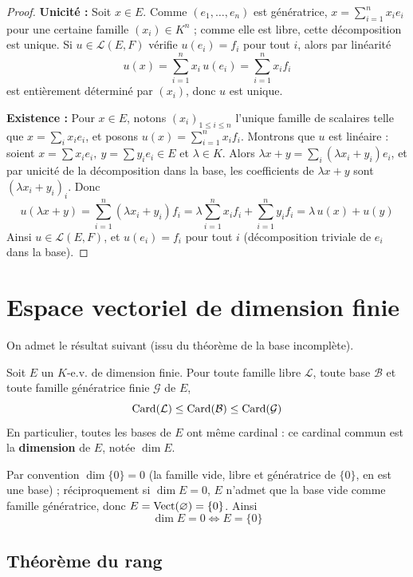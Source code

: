 \begin{proof}
\textbf{Unicité :} Soit $x\in E$. Comme $(e_1,\dots,e_n)$ est génératrice, $x=\sum_{i=1}^n x_i e_i$ pour une certaine famille $(x_i)\in K^n$ ; comme elle est libre, cette décomposition est unique. Si $u\in\mathcal{L}(E,F)$ vérifie $u(e_i)=f_i$ pour tout $i$, alors par linéarité
\[u(x) = \sum_{i=1}^n x_i\, u(e_i) = \sum_{i=1}^n x_i f_i\]
est entièrement déterminé par $(x_i)$, donc $u$ est unique.

\textbf{Existence :} Pour $x\in E$, notons $(x_i)_{1\leq i\leq n}$ l'unique famille de scalaires telle que $x=\sum_i x_i e_i$, et posons $u(x)=\sum_{i=1}^n x_i f_i$. Montrons que $u$ est linéaire : soient $x=\sum x_i e_i,\ y=\sum y_i e_i \in E$ et $\lambda\in K$. Alors $\lambda x+y = \sum_i(\lambda x_i+y_i)e_i$, et par unicité de la décomposition dans la base, les coefficients de $\lambda x+y$ sont $(\lambda x_i+y_i)_i$. Donc
\[u(\lambda x+y) = \sum_{i=1}^n (\lambda x_i+y_i) f_i = \lambda\sum_{i=1}^n x_i f_i + \sum_{i=1}^n y_i f_i = \lambda\, u(x)+u(y)\]
Ainsi $u\in\mathcal{L}(E,F)$, et $u(e_i)=f_i$ pour tout $i$ (décomposition triviale de $e_i$ dans la base).
\end{proof}

\section{Espace vectoriel de dimension finie}

On admet le résultat suivant (issu du théorème de la base incomplète).

\begin{prop}
\label{prop:dimension}
Soit $E$ un $K$-e.v. de dimension finie. Pour toute famille libre $\mathcal{L}$, toute base $\mathcal{B}$ et toute famille génératrice finie $\mathcal{G}$ de $E$,
\[\operatorname{Card}(\mathcal{L}) \leq \operatorname{Card}(\mathcal{B}) \leq \operatorname{Card}(\mathcal{G})\]
En particulier, toutes les bases de $E$ ont même cardinal : ce cardinal commun est la \textbf{dimension} de $E$, notée $\dim E$.
\end{prop}

Par convention $\dim\{0\}=0$ (la famille vide, libre et génératrice de $\{0\}$, en est une base) ; réciproquement si $\dim E=0$, $E$ n'admet que la base vide comme famille génératrice, donc $E=\operatorname{Vect}(\varnothing)=\{0\}$. Ainsi
\[\dim E = 0 \iff E=\{0\}\]

\subsection{Théorème du rang}

